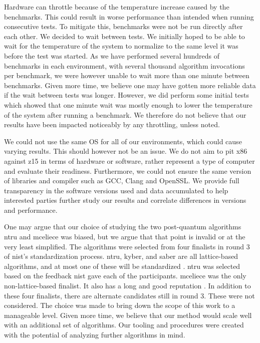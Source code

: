 Hardware can throttle because of the temperature increase caused by the benchmarks. This could result in worse performance than intended when running consecutive tests. To mitigate this, benchmarks were not be run directly after each other. We decided to wait between tests. We initially hoped to be able to wait for the temperature of the system to normalize to the same level it was before the test was started. As we have performed several hundreds of benchmarks in each environment, with several thousand algorithm invocations per benchmark, we were however unable to wait more than one minute between benchmarks. Given more time, we believe one may have gotten more reliable data if the wait between tests was longer. However, we did perform some initial tests which showed that one minute wait was mostly enough to lower the temperature of the system after running a benchmark. We therefore do not believe that our results have been impacted noticeably by any throttling, unless noted. 

We could not use the same OS for all of our environments, which could cause varying results. This should however not be an issue. We do not aim to pit \gls{x86} against \gls{z15} in terms of hardware or software, rather represent a type of computer and evaluate their readiness. Furthermore, we could not ensure the same version of libraries and compiler such as GCC, Clang and OpenSSL. We provide full transparency in the software versions used and data accumulated to help interested parties further study our results and correlate differences in versions and performance.

One may argue that our choice of studying the two post-quantum algorithms \gls{ntru} and \gls{mceliece} was biased, but we argue that that point is invalid or at the very least simplified. The algorithms were selected from four finalists in round 3 of \gls{nist}'s standardization process. \gls{ntru}, \gls{kyber}, and \gls{saber} are all lattice-based algorithms, and at most one of these will be standardized \cite{nist2020}. \gls{ntru} was selected based on the feedback \gls{nist} gave each of the participants. \gls{mceliece} was the only non-lattice-based finalist. It also has a long and good reputation \cite{nist2020}. In addition to these four finalists, there are alternate candidates still in round 3. These were not considered. The choice was made to bring down the scope of this work to a manageable level. Given more time, we believe that our method would scale well with an additional set of algorithms. Our tooling and procedures were created with the potential of analyzing further algorithms in mind.

